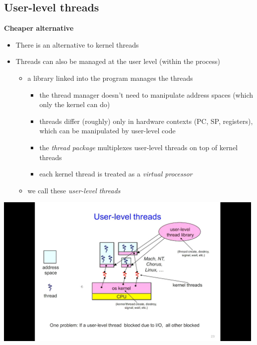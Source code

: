 \documentclass[11pt,a4paper]{article}
\begin{document}
\subsection{User-level threads}

\textbf{Cheaper alternative}
\begin{itemize}
    \item There is an alternative to kernel threads
    \item Threads can also be managed at the user level (within the process)
        \begin{itemize}
            \item a library linked into the program manages the threads
                \begin{itemize}
                    \item the thread manager doesn't need to manipulate address spaces
                        (which only the kernel can do)
                    \item threads differ (roughly) only in hardware contexts
                        (PC, SP, registers), which can be manipulated by user-level code
                    \item the \emph{thread package} multiplexes user-level threads on top
                        of kernel threads
                    \item each kernel thread is treated as a \emph{virtual processor}
                \end{itemize}
            \item we call these \emph{user-level threads}
        \end{itemize}
\end{itemize}

\includegraphics[height=280]{user-level-threads.jpg}
\end{document}
